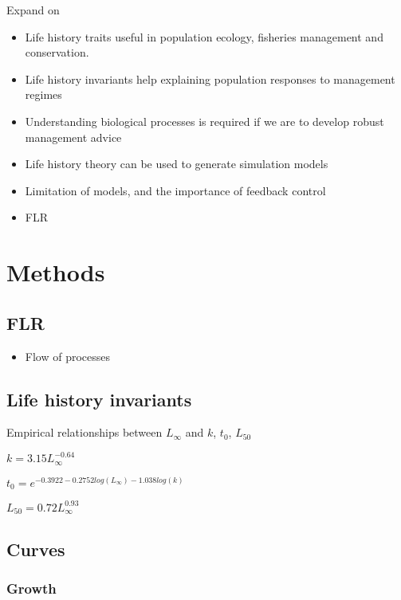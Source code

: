 \documentclass[]{article}
\providecommand{\tightlist}{%
  \setlength{\itemsep}{0pt}\setlength{\parskip}{0pt}}
\begin{document}
\begin{itemize}
Expand on 
\begin{itemize}
\tightlist
\item Life history traits useful in population ecology, fisheries management and conservation.
\item Life history invariants help explaining population responses to management regimes
\item Understanding biological processes is required if we are to develop robust management advice
\item Life history theory can be used to generate simulation models 
\item Limitation of models, and the importance of feedback control
\item FLR \citep{kell2007flr}
\end{itemize}

\newpage
\section{Methods}

\subsection{FLR}\label{flr}

\begin{itemize}
\tightlist
  \item Flow of processes
\end{itemize}

\subsection{Life history invariants}\label{lh}

Empirical relationships between $L_{\infty}$ and $k$, $t_{0}$, $L_{50}$

$k =3.15L_{\infty}^{-0.64}$
 \citep{gislason2008does}

$t_0=e^{-0.3922-0.2752log(L_{\infty})-1.038log(k)}$
 \citep{pauly1979gill} 
 
$L_{50}=0.72L_{\infty}^{0.93}$
\citep{beverton1992patterns}

\subsection{Curves}

\subsubsection{Growth}


\end{itemize}
\end{document}
